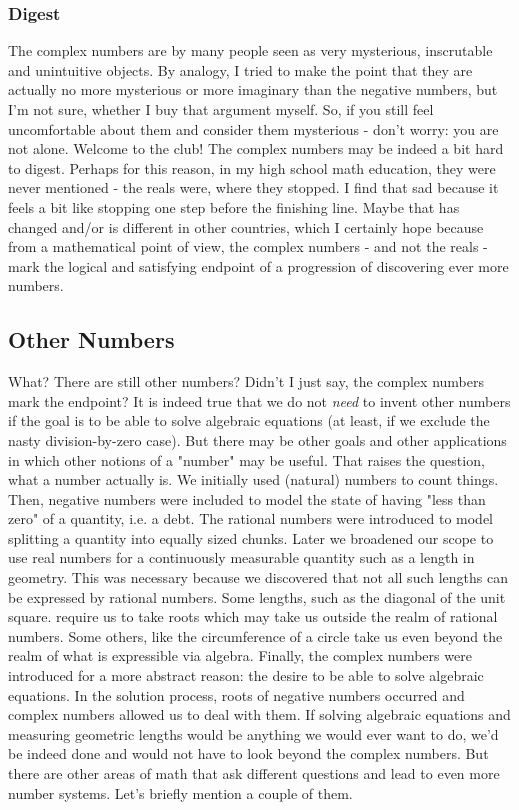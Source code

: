 \subsubsection{Digest}
The complex numbers are by many people seen as very mysterious, inscrutable and unintuitive objects. By analogy, I tried to make the point that they are actually no more mysterious or more imaginary than the negative numbers, but I'm not sure, whether I buy that argument myself. So, if you still feel uncomfortable about them and consider them mysterious - don't worry: you are not alone. Welcome to the club! The complex numbers may be indeed a bit hard to digest. Perhaps for this reason, in my high school math education, they were never mentioned - the reals were, where they stopped. I find that sad because it feels a bit like stopping one step before the finishing line. Maybe that has changed and/or is different in other countries, which I certainly hope because from a mathematical point of view, the complex numbers - and not the reals - mark the logical and satisfying endpoint of a progression of discovering ever more numbers.


\subsection{Other Numbers}
What? There are still other numbers? Didn't I just say, the complex numbers mark the endpoint? It is indeed true that we do not \emph{need} to invent other numbers if the goal is to be able to solve algebraic equations (at least, if we exclude the nasty division-by-zero case). But there may be other goals and other applications in which other notions of a "number" may be useful. That raises the question, what a number actually is. We initially used (natural) numbers to count things. Then, negative numbers were included to model the state of having "less than zero" of a quantity, i.e. a debt. The rational numbers were introduced to model splitting a quantity into equally sized chunks. Later we broadened our scope to use real numbers for a continuously measurable quantity such as a length in geometry. This was necessary because we discovered that not all such lengths can be expressed by rational numbers. Some lengths, such as the diagonal of the unit square. require us to take roots which may take us outside the realm of rational numbers. Some others, like the circumference of a circle take us even beyond the realm of what is expressible via algebra. Finally, the complex numbers were introduced for a more abstract reason: the desire to be able to solve algebraic equations. In the solution process, roots of negative numbers occurred and complex numbers allowed us to deal with them. If solving algebraic equations and measuring geometric lengths would be anything we would ever want to do, we'd be indeed done and would not have to look beyond the complex numbers. But there are other areas of math that ask different questions and lead to even more number systems. Let's briefly mention a couple of them.

